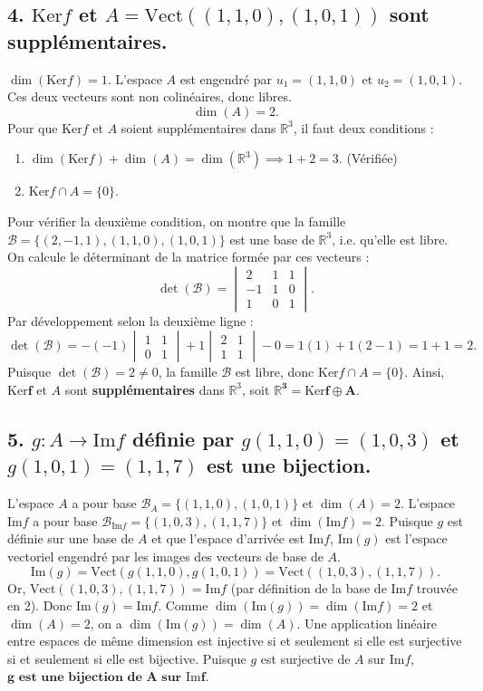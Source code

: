 \documentclass[french]{yLectureNote}
\begin{document}
\subsection*{4. $\mathrm{Ker}f$ et $A=\mathrm{Vect}((1,1,0), (1,0,1))$ sont supplémentaires.}
$\dim(\mathrm{Ker}f) = 1$. L'espace $A$ est engendré par $u_1 = (1,1,0)$ et $u_2 = (1,0,1)$. Ces deux vecteurs sont non colinéaires, donc libres.
$$\dim(A) = 2.$$
Pour que $\mathrm{Ker}f$ et $A$ soient supplémentaires dans $\mathbb{R}^3$, il faut deux conditions :
\begin{enumerate}
    \item $\dim(\mathrm{Ker}f) + \dim(A) = \dim(\mathbb{R}^3) \implies 1 + 2 = 3$. (Vérifiée)
    \item $\mathrm{Ker}f \cap A = \{0\}$.
\end{enumerate}
Pour vérifier la deuxième condition, on montre que la famille $\mathcal{B} = \{(2,-1,1), (1,1,0), (1,0,1)\}$ est une base de $\mathbb{R}^3$, i.e. qu'elle est libre.
On calcule le déterminant de la matrice formée par ces vecteurs :
$$\det(\mathcal{B}) = \begin{vmatrix} 2 & 1 & 1 \\ -1 & 1 & 0 \\ 1 & 0 & 1 \end{vmatrix}.$$
Par développement selon la deuxième ligne :
$$\det(\mathcal{B}) = -(-1) \begin{vmatrix} 1 & 1 \\ 0 & 1 \end{vmatrix} + 1 \begin{vmatrix} 2 & 1 \\ 1 & 1 \end{vmatrix} - 0 = 1(1) + 1(2-1) = 1+1 = 2.$$
Puisque $\det(\mathcal{B}) = 2 \ne 0$, la famille $\mathcal{B}$ est libre, donc $\mathrm{Ker}f \cap A = \{0\}$.
Ainsi, $\mathbf{\mathrm{Ker}f}$ et $A$ sont \textbf{supplémentaires} dans $\mathbb{R}^3$, soit $\mathbf{\mathbb{R}^3 = \mathrm{Ker}f \oplus A}$.

\subsection*{5. $g: A \to \mathrm{Im}f$ définie par $g(1,1,0)=(1,0,3)$ et $g(1,0,1)=(1,1,7)$ est une bijection.}
L'espace $A$ a pour base $\mathcal{B}_A = \{(1,1,0), (1,0,1)\}$ et $\dim(A)=2$.
L'espace $\mathrm{Im}f$ a pour base $\mathcal{B}_{\mathrm{Im}f} = \{(1,0,3), (1,1,7)\}$ et $\dim(\mathrm{Im}f)=2$.
Puisque $g$ est définie sur une base de $A$ et que l'espace d'arrivée est $\mathrm{Im}f$, $\mathrm{Im}(g)$ est l'espace vectoriel engendré par les images des vecteurs de base de $A$.
$$\mathrm{Im}(g) = \mathrm{Vect}(g(1,1,0), g(1,0,1)) = \mathrm{Vect}((1,0,3), (1,1,7)).$$
Or, $\mathrm{Vect}((1,0,3), (1,1,7)) = \mathrm{Im}f$ (par définition de la base de $\mathrm{Im}f$ trouvée en 2).
Donc $\mathrm{Im}(g) = \mathrm{Im}f$.
Comme $\dim(\mathrm{Im}(g)) = \dim(\mathrm{Im}f) = 2$ et $\dim(A)=2$, on a $\dim(\mathrm{Im}(g)) = \dim(A)$.
Une application linéaire entre espaces de même dimension est injective si et seulement si elle est surjective si et seulement si elle est bijective.
Puisque $g$ est surjective de $A$ sur $\mathrm{Im}f$, $\mathbf{g \text{ est une bijection de } A \text{ sur } \mathrm{Im}f}$.
\end{document}

